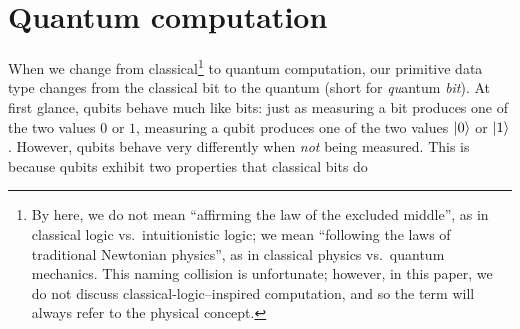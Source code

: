 \documentclass[12pt]{amsart}
\begin{document}
\section{Quantum computation}\label{sec:quantum-computation}

When we change from classical\footnote{By  here, we do not mean
``affirming the law of the excluded middle'', as in classical logic
vs.\ intuitionistic logic; we mean ``following the laws of traditional Newtonian
physics'', as in classical physics vs.\ quantum mechanics.  This naming
collision is unfortunate; however, in this paper, we do not discuss
classical-logic--inspired computation, and so the term will always refer to the
physical concept.} to quantum computation,
our primitive data type changes from the classical bit to the quantum
 (short for \emph{qu}antum \emph{bit}).  At first glance, qubits
behave much like bits: just as measuring a bit produces one of the two values
$0$ or $1$, measuring a qubit produces one of the two values ${\left\vert{0}\right\rangle}$ or
${\left\vert{1}\right\rangle}$.  However, qubits behave very differently when \emph{not} being
measured.  This is because qubits exhibit two properties that classical bits do
\end{document}
